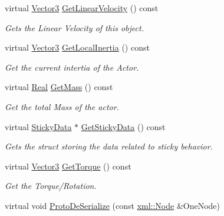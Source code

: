 \begin{DoxyCompactItemize}
virtual \hyperlink{classMezzanine_1_1Vector3}{Vector3} \hyperlink{classMezzanine_1_1ActorRigidPhysicsSettings_ad238bf0f6d19a65a79a7b8bc0fb552bd}{GetLinearVelocity} () const 
\begin{DoxyCompactList}\small\item\em Gets the Linear Velocity of this object. \item\end{DoxyCompactList}\item 
virtual \hyperlink{classMezzanine_1_1Vector3}{Vector3} \hyperlink{classMezzanine_1_1ActorRigidPhysicsSettings_a71fae7a868e31ce14612336292bc0fca}{GetLocalInertia} () const 
\begin{DoxyCompactList}\small\item\em Get the current intertia of the Actor. \item\end{DoxyCompactList}\item 
virtual \hyperlink{namespaceMezzanine_a726731b1a7df72bf3583e4a97282c6f6}{Real} \hyperlink{classMezzanine_1_1ActorRigidPhysicsSettings_a6426940001f8d8e112763f6619278874}{GetMass} () const 
\begin{DoxyCompactList}\small\item\em Get the total Mass of the actor. \item\end{DoxyCompactList}\item 
virtual \hyperlink{structMezzanine_1_1StickyData}{StickyData} $\ast$ \hyperlink{classMezzanine_1_1ActorRigidPhysicsSettings_af3b11efb413c1e6a80e4fd5cd3f44715}{GetStickyData} () const 
\begin{DoxyCompactList}\small\item\em Gets the struct storing the data related to sticky behavior. \item\end{DoxyCompactList}\item 
virtual \hyperlink{classMezzanine_1_1Vector3}{Vector3} \hyperlink{classMezzanine_1_1ActorRigidPhysicsSettings_ae7406aca16a67e3ef959ff9cb76a0f44}{GetTorque} () const 
\begin{DoxyCompactList}\small\item\em Get the Torque/Rotation. \item\end{DoxyCompactList}\item 
virtual void \hyperlink{classMezzanine_1_1ActorRigidPhysicsSettings_a3858fe916114998aee33005fd2a968e7}{ProtoDeSerialize} (const \hyperlink{classMezzanine_1_1xml_1_1Node}{xml::Node} \&OneNode)

\end{DoxyCompactItemize}
